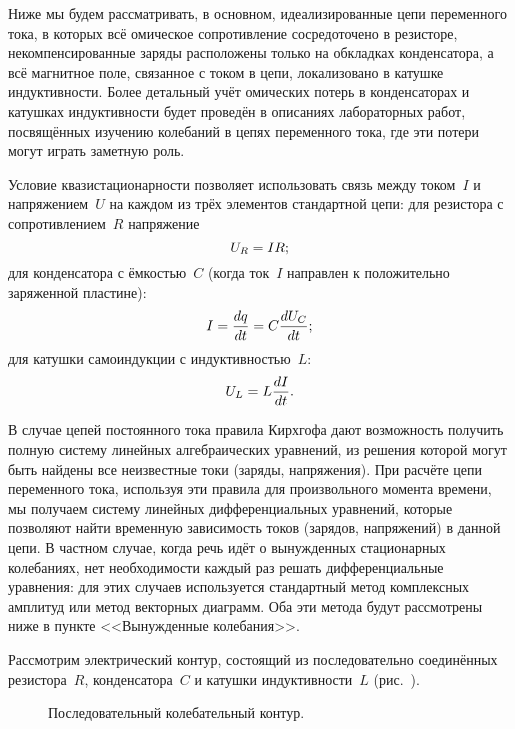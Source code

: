 \documentclass[a4paper,oneside]{book}
\begin{document}
Ниже мы будем рассматривать, в основном, идеализированные цепи переменного тока,
в которых всё омическое сопротивление сосредоточено в резисторе,
некомпенсированные заряды расположены только на обкладках конденсатора, а всё
магнитное поле, связанное с током в цепи, локализовано в катушке индуктивности.
Более детальный учёт омических потерь в конденсаторах и катушках индуктивности
будет проведён в описаниях лабораторных работ, посвящённых изучению колебаний в
цепях переменного тока, где эти потери могут играть заметную роль.

Условие квазистационарности позволяет использовать связь между током~$I$ и
напряжением~$U$ на каждом из трёх элементов стандартной цепи:
для резистора с сопротивлением~$R$ напряжение
\begin{equation}
	\eqmark{2.1}
	U_R=IR;
\end{equation}
для конденсатора с ёмкостью~$C$ (когда ток~$I$ направлен к положительно
заряженной пластине):
\begin{equation}
	\eqmark{2.2}
	I=\dfrac{dq}{dt}=C\dfrac{dU_C}{dt};
\end{equation}
для катушки самоиндукции с индуктивностью~$L$:
\begin{equation}
	\eqmark{2.3}
	U_L=L\dfrac{dI}{dt}.
\end{equation}

В случае цепей постоянного тока правила Кирхгофа дают возможность получить
полную систему линейных алгебраических уравнений, из решения которой могут быть
найдены все неизвестные токи (заряды, напряжения). При расчёте цепи переменного
тока, используя эти правила для произвольного момента времени, мы получаем
систему линейных дифференциальных уравнений, которые позволяют найти временную
зависимость токов (зарядов, напряжений) в данной цепи. В частном случае, когда
речь идёт о вынужденных стационарных колебаниях, нет необходимости каждый раз
решать дифференциальные уравнения: для этих случаев используется стандартный
метод комплексных амплитуд или метод векторных диаграмм. Оба эти метода будут
рассмотрены ниже в пункте <<Вынужденные колебания>>.


Рассмотрим электрический контур, состоящий из последовательно соединённых
резистора~$R$, конденсатора~$C$ и катушки индуктивности~$L$
(рис.~).

\begin{figure}[h!]
	\centering
	\caption{Последовательный колебательный контур.}
\end{figure}
\end{document}
